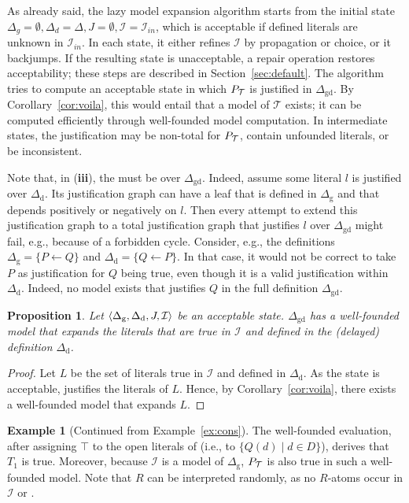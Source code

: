\documentclass[11pt]{article}
\newcommand{\m}[1]{\ensuremath{#1}\xspace}
\newcommand{\lrule}{\m{\leftarrow}}
\newcommand{\true}{\m{\top}}
\newcommand{\I}{\m{\mathcal{I}}}
\newcommand{\Iin}{\m{\I_{in}}}
\newcommand{\theory}{\m{\mathcal{T}}}
\newcommand{\D}{\m{\Delta}}
\newcommand{\tuple}[1]{\m{\left \langle #1 \right \rangle }}
\theoremstyle{plain}
\newtheorem{proposition}[thm]{Proposition}
\theoremstyle{definition}
\theoremstyle{example_basic}
\newtheorem{example}[thm]{Example}
\theoremstyle{example_contd}
\theoremstyle{plain}
\newcommand{\Dg}{\ensuremath{\D_\text{g}}\xspace}
\newcommand{\Dd}{\ensuremath{\D_\text{d}}\xspace}
\newcommand{\Dgd}{\ensuremath{\D_\text{gd}}\xspace}
\newcommand{\pt}{\ensuremath{P_\text{\theory}}\xspace}
\newcommand{\tbf}[1]{\textbf{#1}}
\newcommand{\change}[1]{#1}
\begin{document}
\change{As already said, the lazy model expansion algorithm starts from the initial state $\D_g=\emptyset, \D_d=\D, J=\emptyset, \I=\Iin$, which is acceptable if defined literals are unknown in $\Iin$.  In each  state, it either refines $\I$ by  propagation or choice, or it backjumps. If the resulting state is unacceptable, a repair operation restores acceptability; these steps are described in Section~\ref{sec:default}. } The algorithm tries to compute  an acceptable state in which \pt is justified in $\Dgd$. By Corollary~\ref{cor:voila}, this would entail that a model of \theory exists; it can be computed efficiently through well-founded model computation. In intermediate states, the justification may be non-total for \pt, contain unfounded literals, or be inconsistent.

Note that, in (\tbf{iii}), the \justification must be over \Dgd. Indeed,
assume some literal $l$ is justified over \Dd. Its justification graph can
have a leaf that is defined in \Dg and that depends positively or negatively
on $l$. Then every attempt to extend this justification graph to a total
justification graph that justifies $l$ over \Dgd might fail, e.g., because
of a forbidden cycle. \change{Consider, e.g., the definitions $\Dg = \{ P \lrule Q \}$ and $\Dd=\{ Q \lrule P\}$. In that case, it would not be correct to take $P$ as justification for $Q$ being true, even though it is a valid justification within \Dd. Indeed, no model exists that justifies $Q$ in the full definition \Dgd.}

\begin{proposition}\label{prop:model}
  Let $\tuple{\Dg,\Dd,\jgraph,\I}$ be an acceptable state. \Dgd has a
  well-founded model that expands the literals that are true in $\I$
  and defined in the (delayed) definition \Dd.
\end{proposition}
\begin{proof}
  Let $L$ be the set of literals true in $\I$ and defined in \Dd.
  As the state is acceptable, \jgraph justifies the literals of
  $L$. Hence, by Corollary~\ref{cor:voila}, there exists a
  well-founded model that expands $L$.
\end{proof}

\begin{example}[Continued from Example~\ref{ex:cons}]
The well-founded evaluation, after assigning \true to the open
literals of \jgraph (i.e., to $\{Q(d)\mid d \in D\}$), derives that
$T_1$ is true. Moreover, because \I is a model of \Dg, \pt is also true
in such a well-founded model. Note that $R$ can be interpreted 
randomly, as no $R$-atoms occur in \I or \jgraph.
\end{example}
\end{document}
